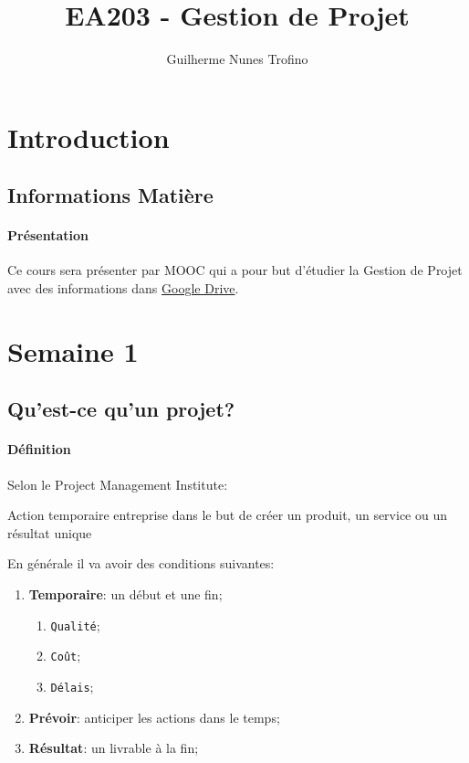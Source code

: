 \documentclass{article}
\title{EA203 - Gestion de Projet}
\author{Guilherme Nunes Trofino}
\begin{document}
\maketitle

\newpage\tableofcontents

\section{Introduction}

% 

\subsection{Informations Matière}
\paragraph{Présentation}Ce cours sera présenter par MOOC qui a pour but d'étudier la Gestion de Projet avec des informations dans \href{https://drive.google.com/drive/folders/0B2LN5eYzM2xhNlZORkVCQjBpQTA?resourcekey=0-hcgRqPSj5pIJUyyMe8y2cA}{Google Drive}.

\section{Semaine 1}
\subsection{Qu'est-ce qu'un projet?}
\paragraph{Définition}Selon le Project Management Institute:
\begin{phrase}
    Action temporaire entreprise dans le but de créer un produit, un service ou un résultat unique
\end{phrase}
En générale il va avoir des conditions suivantes:
\begin{enumerate}
    \item \textbf{Temporaire}: un début et une fin;
    \begin{enumerate}[noitemsep]
        \item \texttt{Qualité};
        \item \texttt{Coût};
        \item \texttt{Délais};
    \end{enumerate}
    \item \textbf{Prévoir}: anticiper les actions dans le temps;
    \item \textbf{Résultat}: un livrable à la fin;
\end{enumerate}
\end{document}
